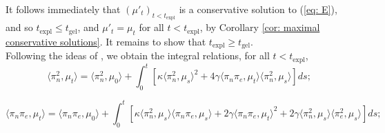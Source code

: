 It follows immediately that $(\mu'_t)_{t<t_\mathrm{expl}}$ is a  conservative solution to (\ref{eq: E}), and so $t_\mathrm{expl} \le t_\mathrm{gel}$, and $\mu'_t=\mu_t$ for all $t<t_\mathrm{expl}$, by Corollary \ref{cor: maximal conservative solutions}. It remains to show that $t_\mathrm{expl}\ge t_\mathrm{gel}$. \medskip \\ Following the ideas of \cite[Proposition 2.7]{N00}, we obtain the integral relations, for all $t<t_\mathrm{expl}$, \begin{equation} \label{eq: ODE1}
    \langle \pi_n^2, \mu_t\rangle =
    \langle \pi_n^2, \mu_0\rangle + \int_0^t \left[\kappa\langle \pi_n^2, \mu_s\rangle^2+4\gamma\langle \pi_n\pi_e, \mu_t\rangle\langle\pi_n^2, \mu_s\rangle \right] ds;
\end{equation} 

\begin{equation}\label{eq: ODE2}
    \langle \pi_n \pi_e, \mu_t\rangle =
    \langle \pi_n\pi_e, \mu_0\rangle + \int_0^t \left[\kappa\langle \pi_n^2, \mu_s\rangle\langle \pi_n\pi_e, \mu_s\rangle+2\gamma\langle \pi_n\pi_e, \mu_t\rangle^2+2\gamma\langle\pi_n^2, \mu_s\rangle\langle \pi_e^2, \mu_s \rangle \right] ds;
\end{equation}

